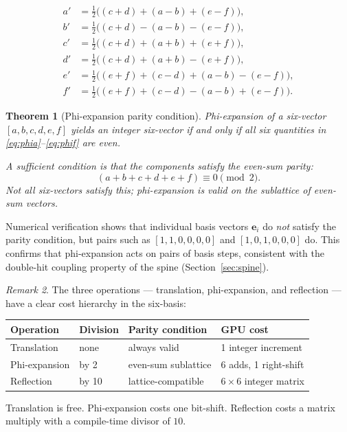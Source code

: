 \documentclass[12pt]{article}
\newtheorem{theorem}{Theorem}[section]
\theoremstyle{definition}
\theoremstyle{remark}
\newtheorem{remark}[theorem]{Remark}
\begin{document}
\begin{align}
  a' &= \tfrac{1}{2}\bigl((c+d) + (a-b)+(e-f)\bigr), \label{eq:phia}\\
  b' &= \tfrac{1}{2}\bigl((c+d) - (a-b)-(e-f)\bigr), \\
  c' &= \tfrac{1}{2}\bigl((c+d)+(a+b) + (e+f)\bigr), \\
  d' &= \tfrac{1}{2}\bigl((c+d)+(a+b) - (e+f)\bigr), \\
  e' &= \tfrac{1}{2}\bigl((e+f)+(c-d) + (a-b)-(e-f)\bigr), \\
  f' &= \tfrac{1}{2}\bigl((e+f)+(c-d) - (a-b)+(e-f)\bigr). \label{eq:phif}
\end{align}

\begin{theorem}[Phi-expansion parity condition]
\label{thm:phiexp}
Phi-expansion of a six-vector $[a,b,c,d,e,f]$ yields an integer
six-vector if and only if all six quantities in
\eqref{eq:phia}--\eqref{eq:phif} are even.

A sufficient condition is that the components satisfy the
\emph{even-sum parity}:
\[
  (a+b+c+d+e+f) \equiv 0 \pmod{2}.
\]
Not all six-vectors satisfy this; phi-expansion is valid on the
sublattice of even-sum vectors.
\end{theorem}

Numerical verification shows that individual basis vectors
$\mathbf{e}_i$ do \emph{not} satisfy the parity condition, but pairs
such as $[1,1,0,0,0,0]$ and $[1,0,1,0,0,0]$ do.  This confirms
that phi-expansion acts on pairs of basis steps, consistent with
the double-hit coupling property of the spine (Section~\ref{sec:spine}).

\begin{remark}
The three operations --- translation, phi-expansion, and reflection
--- have a clear cost hierarchy in the six-basis:

\begin{center}
\renewcommand{\arraystretch}{1.3}
\begin{tabular}{llll}
\toprule
Operation & Division & Parity condition & GPU cost \\
\midrule
Translation   & none  & always valid      & 1 integer increment \\
Phi-expansion & by 2  & even-sum sublattice & 6 adds, 1 right-shift \\
Reflection    & by 10 & lattice-compatible & $6\times6$ integer matrix \\
\bottomrule
\end{tabular}
\end{center}

Translation is free.  Phi-expansion costs one bit-shift.  Reflection
costs a matrix multiply with a compile-time divisor of $10$.
\end{remark}
\end{document}
